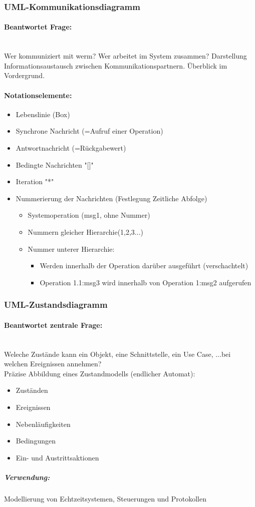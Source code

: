\documentclass[../ZF_SWEN1.tex]{subfiles}
\begin{document}
	



\subsubsection{UML-Kommunikationsdiagramm}
\paragraph{Beantwortet Frage:}\\
Wer kommuniziert mit werm? Wer arbeitet im System zusammen? Darstellung Informationsaustausch zwischen Kommunikationspartnern. Überblick im Vordergrund.
\paragraph{Notationselemente:}
\begin{itemize}
	\item Lebenslinie (Box)
	\item Synchrone Nachricht (=Aufruf einer Operation)
	\item Antwortnachricht (=Rückgabewert)
	\item Bedingte Nachrichten "[]"
	\item Iteration "*"
	\item Nummerierung der Nachrichten (Festlegung Zeitliche Abfolge)
	\begin{itemize}
		\item Systemoperation (msg1, ohne Nummer)
		\item Nummern gleicher Hierarchie(1,2,3...)
		\item Nummer unterer Hierarchie:
		\begin{itemize}
			\item Werden innerhalb der Operation darüber ausgeführt (verschachtelt)
			\item Operation 1.1:msg3 wird innerhalb von Operation 1:msg2 aufgerufen
		\end{itemize}
	\end{itemize}

\end{itemize}

\subsubsection{UML-Zustandsdiagramm}
\paragraph{Beantwortet zentrale Frage:}\\
Weleche Zustände kann ein Objekt, eine Schnittstelle, ein Use Case, ...bei welchen Ereignissen annehmen?\\
Präzise Abbildung eines Zustandmodells (endlicher Automat):
\begin{itemize}
	\item Zuständen
	\item Ereignissen
	\item Nebenläufigkeiten
	\item Bedingungen
	\item Ein- und Austrittsaktionen
\end{itemize}
\subparagraph{Verwendung:} Modellierung von Echtzeitsystemen, Steuerungen und Protokollen 
\end{document}
